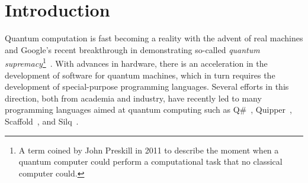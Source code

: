 \documentclass[adraft,creativecommons]{eptcs}
\title{\titlerunning}
\author{
\authorrunning
\institute{University of Chicago}
\email{\mailtodomain{ks@cs.uchicago.edu}}
}
\theoremstyle{definition}
\theoremstyle{remark}
\begin{document}
\maketitle

\begin{abstract}
    As quantum computers become real, it is high time we come up with effective techniques that help programmers write correct quantum programs. Inspired by Hoare Type Theory in classical computing, we propose Quantum Hoare Type Theory (QHTT) in which precise specifications about the modification to the quantum state can be provided within the type of a computation. These specifications within a Hoare type are given in the form of Hoare-logic style pre- and postconditions following the propositions-as-types principle. The type-checking process verifies that the implementation conforms to the provided specification. QHTT has the potential to be a unified system for programming, specifying, and reasoning about quantum programs.
\end{abstract}

\thispagestyle{empty}

\tableofcontents

\listoftables

\listoffigures

\lstlistoflistings

\setlength{\parskip}{1em}

\section{Introduction}

Quantum computation is fast becoming a reality with the advent of real machines and Google's recent breakthrough in demonstrating so-called \textit{quantum supremacy}\footnote{A term coined by John Preskill in 2011 to describe the moment when a quantum computer could perform a computational task that no classical computer could.}~\parencite{supremacy19,Preskill2012}. With advances in hardware, there is an acceleration in the development of software for quantum machines, which in turn requires the development of special-purpose programming languages. Several efforts in this direction, both from academia and industry, have recently led to many programming languages aimed at quantum computing such as Q\#~\parencite{qsharp2018}, Quipper~\parencite{quipper2013}, Scaffold~\parencite{scaffold12}, and Silq~\parencite{silq20}.
\end{document}
